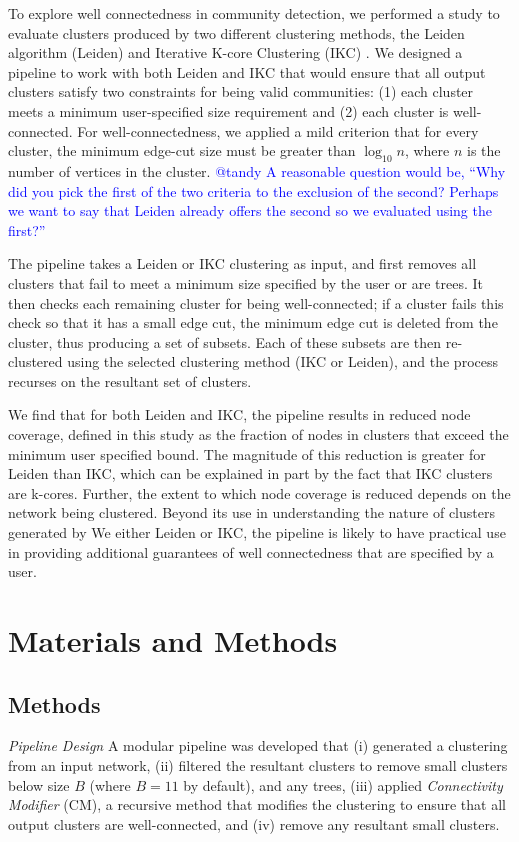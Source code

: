 \documentclass[12pt, oneside]{article}   	%
\begin{document}
To explore well connectedness in community detection, we performed a study to evaluate  clusters produced by two different clustering methods, the Leiden algorithm (Leiden) \citep{Traag_2019} and Iterative K-core Clustering (IKC) \citep{Wedell2022}. We designed a pipeline to work with both Leiden and IKC that would ensure that all output clusters satisfy two constraints for being valid communities: (1) each cluster meets a minimum user-specified size requirement
and (2) each cluster is well-connected. For well-connectedness, we applied a mild criterion that for every cluster, the minimum edge-cut size must be greater than $\log_{10}n$, where $n$ is the number of vertices in the cluster. \textcolor{blue}{@tandy A reasonable question would be, ``Why did you pick the first of the two criteria to the exclusion of the second? Perhaps we want to say that Leiden already offers the second so we evaluated using the first?''}

The pipeline takes a Leiden or IKC clustering as input, and first removes all clusters that fail to meet a minimum size specified by the user or are trees. It then checks each remaining cluster for being well-connected; if a cluster fails this check so that it has a small edge cut, the minimum edge cut is deleted from the cluster, thus producing a set of subsets.  Each of these subsets are then re-clustered using the selected clustering method (IKC or Leiden), and the process recurses on the resultant set of clusters.

We find that for both Leiden and IKC, the pipeline results in reduced node coverage, defined in this study as the fraction of nodes in clusters that exceed the minimum user specified bound. The magnitude of this reduction is greater for Leiden than IKC, which can be explained in part by the fact that IKC clusters are k-cores. Further, the extent to which node coverage is reduced depends on the network being clustered. Beyond its use in understanding the nature of clusters generated by We either Leiden or IKC, the pipeline is likely to have practical use in providing additional guarantees of well connectedness that are specified by a user. 

\section{Materials and Methods}

\subsection{Methods} 
\emph{Pipeline Design} A modular pipeline was developed that (i) generated a clustering from an input network, (ii) filtered the resultant clusters to remove small clusters below size $B$ (where $B=11$ by default), and any trees, (iii) applied \emph{Connectivity Modifier} (CM), a recursive  method that modifies the clustering to ensure that all output clusters are well-connected, and (iv) remove any resultant small clusters.
\end{document}
